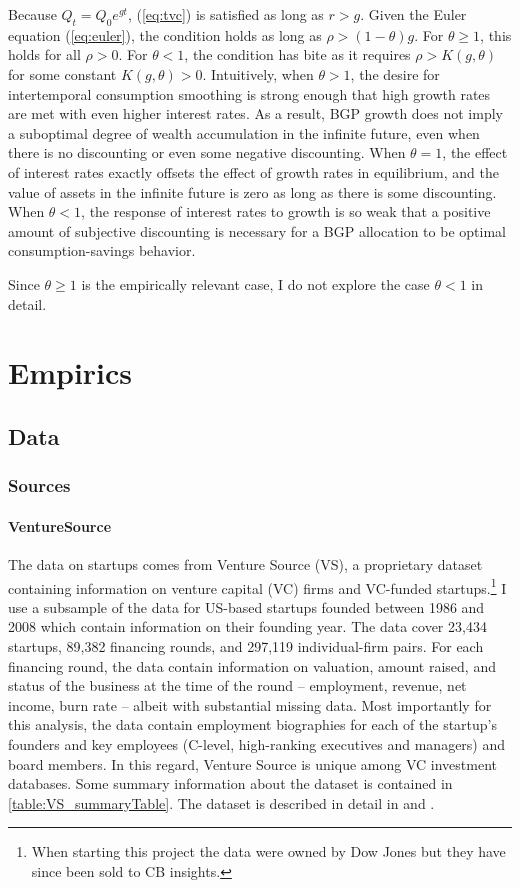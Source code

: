 \documentclass[11pt,english]{article}
\theoremstyle{remark}
\begin{document}
Because $Q_t = Q_0 e^{gt}$, (\ref{eq:tvc}) is satisfied as long as $r > g$. Given the Euler equation (\ref{eq:euler}), the condition holds as long as $\rho > (1-\theta)g$.  For $\theta \ge 1$, this holds for all $\rho > 0$.  For $\theta < 1$, the condition has bite as it requires $\rho > K(g,\theta)$ for some constant $K(g,\theta) > 0$. Intuitively, when $\theta > 1$, the desire for intertemporal consumption smoothing is strong enough that high growth rates are met with even higher interest rates. As a result, BGP growth does not imply a suboptimal degree of wealth accumulation in the infinite future, even when there is no discounting or even some negative discounting. When $\theta = 1$, the effect of interest rates exactly offsets the effect of growth rates in equilibrium, and the value of assets in the infinite future is zero as long as there is some discounting. When $\theta < 1$, the response of interest rates to growth is so weak that a positive amount of subjective discounting is necessary for a BGP allocation to be optimal consumption-savings behavior.

Since $\theta \ge 1$ is the empirically relevant case, I do not explore the case $\theta < 1$ in detail.

\section{Empirics}

\subsection{Data}

\subsubsection{Sources}

\paragraph{VentureSource}

The data on startups comes from Venture Source (VS), a proprietary dataset containing information on venture capital (VC) firms and VC-funded startups.\footnote{When starting this project the data were owned by Dow Jones but they have since been sold to CB insights.} I use a subsample of the data for US-based startups founded between 1986 and 2008 which contain information on their founding year. The data cover 23,434 startups, 89,382 financing rounds, and 297,119 individual-firm pairs. For each financing round, the data contain information on valuation, amount raised, and status of the business at the time of the round -- employment, revenue, net income, burn rate -- albeit with substantial missing data. Most importantly for this analysis, the data contain employment biographies for each of the startup's founders and key employees (C-level, high-ranking executives and managers) and board members. In this regard, Venture Source is unique among VC investment databases. Some summary information about the dataset is contained in \autoref{table:VS_summaryTable}. The dataset is described in detail in \cite{kaplan_how_2002} and \cite{kaplan_venture_2016}. 
\end{document}
